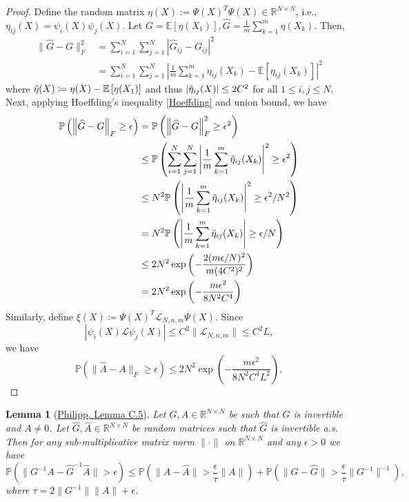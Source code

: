 \documentclass{article}[11]
\newtheorem{lemma}[theorem]{Lemma}
\begin{document}
	\begin{proof}
		Define the random matrix $\eta(X):= \Psi(X)^T \Psi(X) \in \mathbb{R}^{N \times N}$, i.e., $\eta_{ij}(X) = \psi_i(X)\psi_j(X)$. Let $G = \mathbb{E}[\eta(X_1)], \widehat{G} = \frac{1}{m}\sum_{k=1}^{m} \eta(X_k)$. Then, 
		\begin{align*}
			\| \widehat{G} - G \|_F^2 &= \sum_{i=1}^{N}\sum_{j=1}^{N} \left| \widehat{G}_{ij} - G_{ij} \right|^2 \\
			&= \sum_{i=1}^{N}\sum_{j=1}^{N} \left| \frac{1}{m}\sum_{k=1}^m \eta_{ij}(X_k) - \mathbb{E}\left[\eta_{ij}(X_k)\right] \right|^2
		\end{align*}
		where $\Tilde{\eta}(X) \coloneqq \eta(X) - \mathbb{E}\left[\eta(X_1)\right]$ and thus $\left| \Tilde{\eta}_{ij}(X) \right| \leq 2C^2$ for all $1 \leq i,j \leq N$.
		Next, applying Hoeffding's inequality \eqref{Hoeffding} and union bound, we have
		\begin{align*}
			\mathbb{P} \left( \left\| \widehat{G} - G \right\|_F \geq \epsilon \right) &= \mathbb{P} \left( \left\| \widehat{G} - G \right\|_F^2 \geq \epsilon^2 \right) \\
			&\leq \mathbb{P} \left( \sum_{i=1}^{N}\sum_{j=1}^{N} \left| \frac{1}{m} \sum_{k=1}^m \Tilde{\eta}_{ij}(X_k) \right|^2 \geq \epsilon^2 \right) \\
			&\leq N^2 \mathbb{P} \left( \left| \frac{1}{m} \sum_{k=1}^m \Tilde{\eta}_{ij}(X_k) \right|^2 \geq \epsilon^2/N^2 \right) \\
			&= N^2 \mathbb{P} \left( \left| \frac{1}{m} \sum_{k=1}^m \Tilde{\eta}_{ij}(X_k) \right| \geq \epsilon/N \right) \\
			&\leq 2N^2 \exp \left( -\frac{2(m\epsilon/N)^2}{m(4C^2)^2} \right) \\
			&= 2N^2 \exp \left( -\frac{m \epsilon^2}{8 N^2 C^4} \right)
		\end{align*}
		Similarly, define $\xi(X) \coloneqq \Psi(X)^T \mathcal{L}_{N,n,m}\Psi(X)$. Since 
		\[ |\psi_i(X) \mathcal{L} \psi_j(X)| \leq C^2\|\mathcal{L}_{N,n,m}\| \leq C^2 L, \]
		we have
		\[ \mathbb{P} \left( \| \widehat{A} - A \|_F \geq \epsilon \right) \leq 2 N^2 \exp \left( -\frac{m\epsilon^2}{8 N^2 C^4 L^2} \right), \]
	\end{proof}
	
	
	\begin{lemma}[\href{https://arxiv.org/pdf/2402.02494}{Philipp, Lemma C.5}]\label{Philipp}
		Let $G, A \in \mathbb{R}^{N \times N}$ be such that $G$ is invertible and $A \neq 0$. Let $\widehat{G}, \widehat{A} \in \mathbb{R}^{N \times N}$ be random matrices such that $\widehat{G}$ is invertible a.s. Then for any sub-multiplicative matrix norm $\|\cdot\|$ on $\mathbb{R}^{N \times N}$ and any $\epsilon > 0$ we have
		\[
		\mathbb{P}\left(\|G^{-1}A - \widehat{G}^{-1}\widehat{A}\| > \epsilon \right) \leq \mathbb{P}\left(\|A - \widehat{A}\| > \frac{\epsilon}{\tau} \|A\|\right) + \mathbb{P}\left(\|G - \widehat{G}\| > \frac{\epsilon}{\tau} \|G^{-1}\|^{-1}\right),
		\]
		where $\tau = 2\|G^{-1}\|\|A\| + \epsilon$.
	\end{lemma}
	
\end{document}
